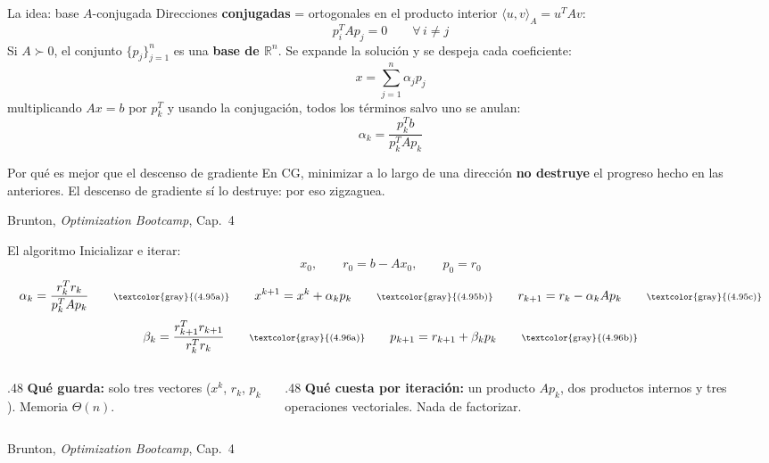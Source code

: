 \documentclass[10pt,aspectratio=169]{beamer}
\newcommand{\fuente}{\vfill{\scriptsize\color{gray}Brunton, \emph{Optimization Bootcamp}, Cap.~4}}
\newcommand{\R}{\mathbb{R}}
\begin{document}
\begin{frame}{La idea: base $A$-conjugada}
  \small
  Direcciones \textbf{conjugadas} = ortogonales en el producto interior
  $\langle u,v\rangle_A = u^TAv$:
  \[
    p_i^TAp_j = 0 \qquad \forall\, i \ne j \tag{4.83}
  \]
  Si $A \succ 0$, el conjunto $\{p_j\}_{j=1}^n$ es una \textbf{base de
  $\R^n$}. Se expande la solución y se despeja cada coeficiente:
  \[
    x = \sum_{j=1}^{n}\alpha_j p_j \tag{4.84}
  \]
  multiplicando $Ax=b$ por $p_k^T$ y usando la conjugación, todos los términos
  salvo uno se anulan:
  \[
    \alpha_k = \frac{p_k^Tb}{p_k^TAp_k} \tag{4.88}
  \]
  \begin{block}{Por qué es mejor que el descenso de gradiente}
    \scriptsize
    En CG, minimizar a lo largo de una dirección \textbf{no destruye} el progreso
    hecho en las anteriores. El descenso de gradiente sí lo destruye: por eso
    zigzaguea.
  \end{block}
  \fuente
\end{frame}

\begin{frame}{El algoritmo}
  \small
  Inicializar e iterar:
  \[
    x_0,\qquad r_0 = b-Ax_0,\qquad p_0 = r_0 \tag{4.94}
  \]
  \[
    \alpha_k = \frac{r_k^Tr_k}{p_k^TAp_k} \qquad\text{\scriptsize\textcolor{gray}{(4.95a)}}
    \qquad
    x^{k+1} = x^k + \alpha_k p_k \qquad\text{\scriptsize\textcolor{gray}{(4.95b)}}
    \qquad
    r_{k+1} = r_k - \alpha_k Ap_k \qquad\text{\scriptsize\textcolor{gray}{(4.95c)}}
  \]
  \[
    \beta_k = \frac{r_{k+1}^Tr_{k+1}}{r_k^Tr_k} \qquad\text{\scriptsize\textcolor{gray}{(4.96a)}}
    \qquad
    p_{k+1} = r_{k+1} + \beta_k p_k \qquad\text{\scriptsize\textcolor{gray}{(4.96b)}}
  \]

  \begin{columns}[T,onlytextwidth]
    \begin{column}{.48\textwidth}
      \textbf{Qué guarda:} solo tres vectores ($x^k$, $r_k$, $p_k$).
      Memoria $\Theta(n)$.
    \end{column}
    \begin{column}{.48\textwidth}
      \textbf{Qué cuesta por iteración:} un producto $Ap_k$, dos productos
      internos y tres operaciones vectoriales. Nada de factorizar.
    \end{column}
  \end{columns}
  \fuente
\end{frame}
\end{document}

